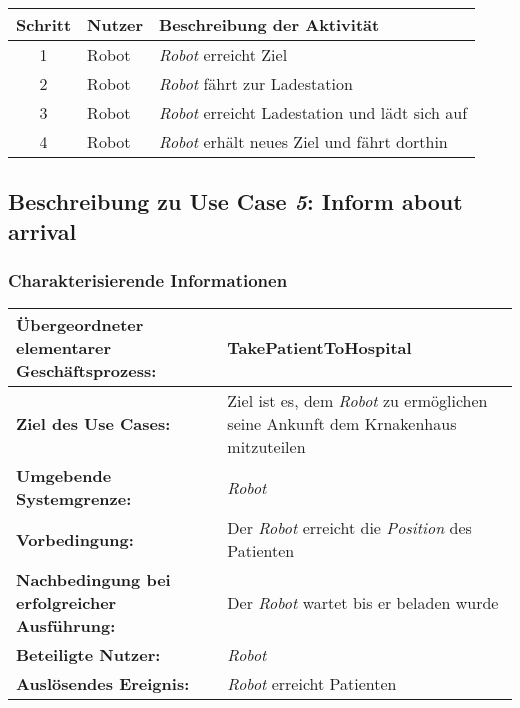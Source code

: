 			\begin{table}[H]
				\centering
				\begin{tabularx}{\textwidth}{@{}cp{2cm}X@{}}
				\hline
				Schritt & Nutzer & Beschreibung der Aktivität \\ \hline
				1 & Robot & \emph{Robot} erreicht Ziel \\
				2 & Robot & \emph{Robot} fährt zur Ladestation \\
				3 & Robot & \emph{Robot} erreicht Ladestation und lädt sich auf \\
				4 & Robot & \emph{Robot} erhält neues Ziel und fährt dorthin \\
				\hline
				\end{tabularx}
			\end{table}

			
		\pagebreak
		
			\subsection{Beschreibung zu Use Case \emph{5}: Inform about arrival}

			\subsubsection*{Charakterisierende Informationen}

			\begin{table}[H]
				\centering
				\begin{tabularx}{\textwidth}{@{}p{5cm}X@{}}
				\hline
				\textbf{Übergeordneter elementarer Geschäftsprozess:} & TakePatientToHospital\\ \hline
				\textbf{Ziel des Use Cases:} & Ziel ist es, dem \emph{Robot} zu ermöglichen seine Ankunft dem Krnakenhaus mitzuteilen\\ \hline
				\textbf{Umgebende Systemgrenze:} & \emph{Robot}\\ \hline
				\textbf{Vorbedingung:} & Der \emph{Robot} erreicht die \emph{Position} des Patienten\\ \hline
				\textbf{Nachbedingung bei erfolgreicher Ausführung:} & Der \emph{Robot} wartet bis er beladen wurde\\ \hline
				\textbf{Beteiligte Nutzer:} & \emph{Robot}\\ \hline
				\textbf{Auslösendes Ereignis:} & \emph{Robot} erreicht Patienten\\
				\hline
				\end{tabularx}
			\end{table}

